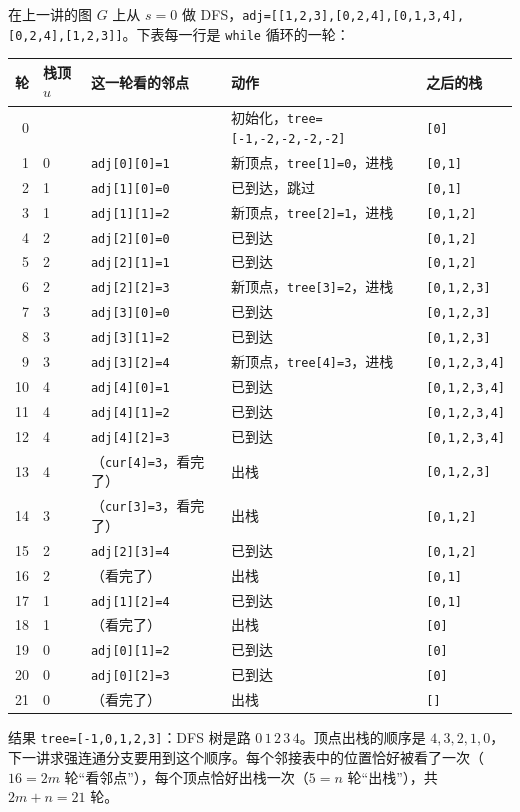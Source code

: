 \begin{example}\label{ex:traversal:dfs}
在上一讲的图 $G$ 上从 $s=0$ 做 DFS，\texttt{adj=[[1,2,3],[0,2,4],[0,1,3,4],[0,2,4],[1,2,3]]}。下表每一行是 \texttt{while} 循环的一轮：

\begin{center}
\small
\begin{tabular}{rllll}
\toprule
轮 & 栈顶 $u$ & 这一轮看的邻点 & 动作 & 之后的栈 \\
\midrule
0 & & & 初始化，\texttt{tree=[-1,-2,-2,-2,-2]} & \texttt{[0]} \\
1 & 0 & \texttt{adj[0][0]=1} & 新顶点，\texttt{tree[1]=0}，进栈 & \texttt{[0,1]} \\
2 & 1 & \texttt{adj[1][0]=0} & 已到达，跳过 & \texttt{[0,1]} \\
3 & 1 & \texttt{adj[1][1]=2} & 新顶点，\texttt{tree[2]=1}，进栈 & \texttt{[0,1,2]} \\
4 & 2 & \texttt{adj[2][0]=0} & 已到达 & \texttt{[0,1,2]} \\
5 & 2 & \texttt{adj[2][1]=1} & 已到达 & \texttt{[0,1,2]} \\
6 & 2 & \texttt{adj[2][2]=3} & 新顶点，\texttt{tree[3]=2}，进栈 & \texttt{[0,1,2,3]} \\
7 & 3 & \texttt{adj[3][0]=0} & 已到达 & \texttt{[0,1,2,3]} \\
8 & 3 & \texttt{adj[3][1]=2} & 已到达 & \texttt{[0,1,2,3]} \\
9 & 3 & \texttt{adj[3][2]=4} & 新顶点，\texttt{tree[4]=3}，进栈 & \texttt{[0,1,2,3,4]} \\
10 & 4 & \texttt{adj[4][0]=1} & 已到达 & \texttt{[0,1,2,3,4]} \\
11 & 4 & \texttt{adj[4][1]=2} & 已到达 & \texttt{[0,1,2,3,4]} \\
12 & 4 & \texttt{adj[4][2]=3} & 已到达 & \texttt{[0,1,2,3,4]} \\
13 & 4 & （\texttt{cur[4]=3}，看完了） & 出栈 & \texttt{[0,1,2,3]} \\
14 & 3 & （\texttt{cur[3]=3}，看完了） & 出栈 & \texttt{[0,1,2]} \\
15 & 2 & \texttt{adj[2][3]=4} & 已到达 & \texttt{[0,1,2]} \\
16 & 2 & （看完了） & 出栈 & \texttt{[0,1]} \\
17 & 1 & \texttt{adj[1][2]=4} & 已到达 & \texttt{[0,1]} \\
18 & 1 & （看完了） & 出栈 & \texttt{[0]} \\
19 & 0 & \texttt{adj[0][1]=2} & 已到达 & \texttt{[0]} \\
20 & 0 & \texttt{adj[0][2]=3} & 已到达 & \texttt{[0]} \\
21 & 0 & （看完了） & 出栈 & \texttt{[]} \\
\bottomrule
\end{tabular}
\end{center}

结果 \texttt{tree=[-1,0,1,2,3]}：DFS 树是路 $0\,1\,2\,3\,4$。顶点出栈的顺序是 $4,3,2,1,0$，下一讲求强连通分支要用到这个顺序。每个邻接表中的位置恰好被看了一次（$16=2m$ 轮“看邻点”），每个顶点恰好出栈一次（$5=n$ 轮“出栈”），共 $2m+n=21$ 轮。
\end{example}

